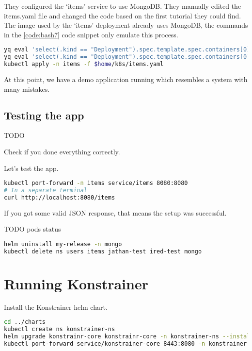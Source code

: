 They configured the `items' service to use MongoDB. They manually edited the items.yaml file and changed the code based on the first tutorial they could find. The image used by the `items' deployment already uses MongoDB, the commands in the \ref{code:bash7} code snippet only emulate this process.

\begin{lstlisting}[caption={Configure the `items' app to use MongoDB},language=bash,label=code:bash7]
yq eval 'select(.kind == "Deployment").spec.template.spec.containers[0].env[0].value = env(MONGODB_ROOT_PASSWORD)' $home/k8s/items.yaml -i
yq eval 'select(.kind == "Deployment").spec.template.spec.containers[0].env[1].value = env(MONGO_HOST)' $home/k8s/items.yaml -i
kubectl apply -n items -f $home/k8s/items.yaml
\end{lstlisting}

At this point, we have a demo application running which resembles a system with many mistakes.

\subsection{Testing the app}

TODO

Check if you done everything correctly.

Let's test the app.

\begin{lstlisting}[caption={TODO},language=bash,label=code:bash8]
kubectl port-forward -n items service/items 8080:8080
# In a separate terminal
curl http://localhost:8080/items
\end{lstlisting}

If you got some valid JSON response, that means the setup was successful.

TODO pods status

\begin{lstlisting}[caption={Teardown},language=bash,label=code:bash9]
helm uninstall my-release -n mongo
kubectl delete ns users items jathan-test ired-test mongo
\end{lstlisting}

\section{Running Konstrainer}

Install the Konstrainer helm chart.

\begin{lstlisting}[caption={TODO},language=bash,label=code:bashx]
cd ../charts
kubectl create ns konstrainer-ns
helm upgrade konstrainr-core konstrainr-core -n konstrainer-ns --install
kubectl port-forward service/konstrainer-core 8443:8080 -n konstrainer-ns
\end{lstlisting}


